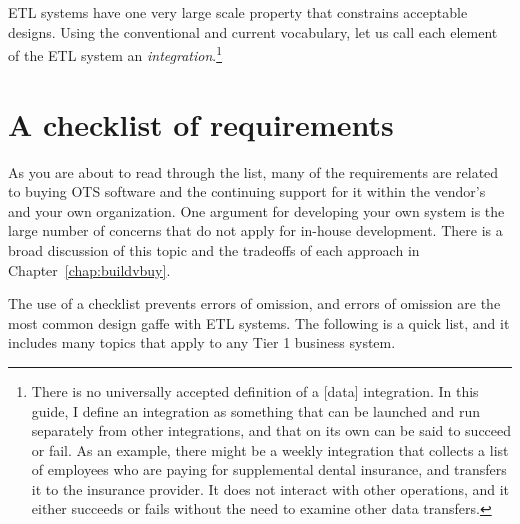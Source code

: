 \documentclass[11pt,letterpaper,twosided]{memoir}
\begin{document}
ETL systems have one very large scale property that constrains
acceptable designs. Using the conventional and current vocabulary,
let us call each element of the ETL system an \emph{integration}.\footnote{
There is no universally accepted definition of a [data] integration.
In this guide, I define an integration as something that can be
launched and run separately from other integrations, and that 
on its own can be said to succeed or fail. As an example, there
might be a weekly integration that collects a list of employees
who are paying for supplemental dental insurance, and transfers
it to the insurance provider. It does not interact with other
operations, and it either succeeds or fails without the need
to examine other data transfers.}

\section{A checklist of requirements}

As you are about to read through the list, many of the requirements
are related to buying OTS software and the continuing support
for it within the vendor's and your own organization. One argument
for developing your own system is the large number of concerns
that do not apply for in-house development. There is a broad
discussion of this topic and the tradeoffs of each approach 
in Chapter~\ref{chap:buildvbuy}.

The use of a checklist prevents errors of omission, and errors
of omission are the most common design gaffe with ETL systems. The
following is a quick list, and it includes many topics that apply
to any Tier 1 business system.
\end{document}
